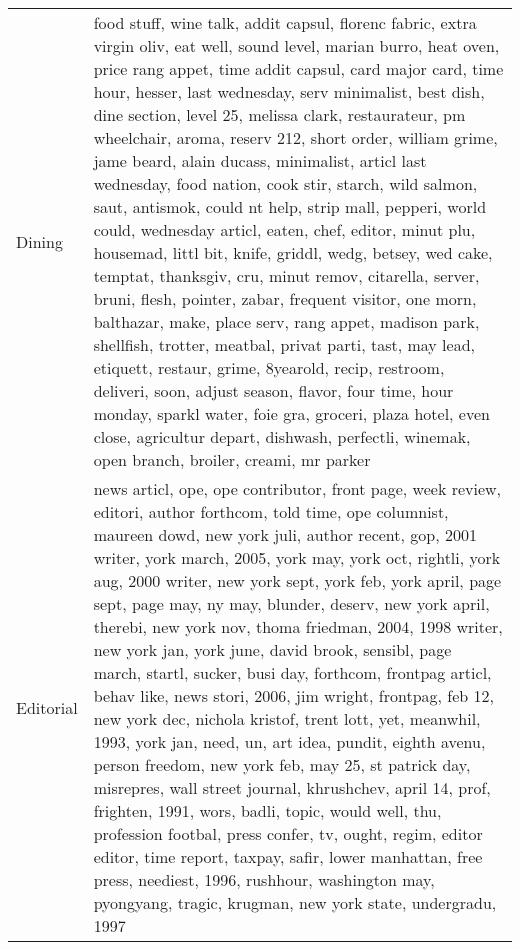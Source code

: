 \begin{longtable}{p{}p{}}
  Dining & food stuff, wine talk, addit capsul, florenc fabric, extra virgin oliv, eat well, sound level, marian burro, heat oven, price rang appet, time addit capsul, card major card, time hour, hesser, last wednesday, serv minimalist, best dish, dine section, level 25, melissa clark, restaurateur, pm wheelchair, aroma, reserv 212, short order, william grime, jame beard, alain ducass, minimalist, articl last wednesday, food nation, cook stir, starch, wild salmon, saut, antismok, could nt help, strip mall, pepperi, world could, wednesday articl, eaten, chef, editor, minut plu, housemad, littl bit, knife, griddl, wedg, betsey, wed cake, temptat, thanksgiv, cru, minut remov, citarella, server, bruni, flesh, pointer, zabar, frequent visitor, one morn, balthazar, make, place serv, rang appet, madison park, shellfish, trotter, meatbal, privat parti, tast, may lead, etiquett, restaur, grime, 8yearold, recip, restroom, deliveri, soon, adjust season, flavor, four time, hour monday, sparkl water, foie gra, groceri, plaza hotel, even close, agricultur depart, dishwash, perfectli, winemak, open branch, broiler, creami, mr parker \\ 
  Editorial & news articl, ope, ope contributor, front page, week review, editori, author forthcom, told time, ope columnist, maureen dowd, new york juli, author recent, gop, 2001 writer, york march, 2005, york may, york oct, rightli, york aug, 2000 writer, new york sept, york feb, york april, page sept, page may, ny may, blunder, deserv, new york april, therebi, new york nov, thoma friedman, 2004, 1998 writer, new york jan, york june, david brook, sensibl, page march, startl, sucker, busi day, forthcom, frontpag articl, behav like, news stori, 2006, jim wright, frontpag, feb 12, new york dec, nichola kristof, trent lott, yet, meanwhil, 1993, york jan, need, un, art idea, pundit, eighth avenu, person freedom, new york feb, may 25, st patrick day, misrepres, wall street journal, khrushchev, april 14, prof, frighten, 1991, wors, badli, topic, would well, thu, profession footbal, press confer, tv, ought, regim, editor editor, time report, taxpay, safir, lower manhattan, free press, neediest, 1996, rushhour, washington may, pyongyang, tragic, krugman, new york state, undergradu, 1997 \\ 

\end{longtable}
